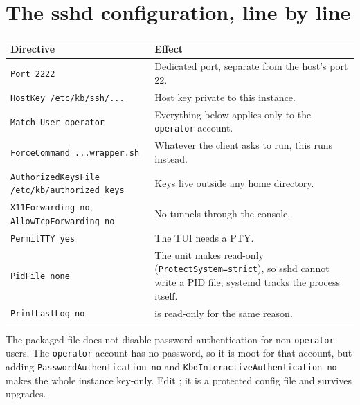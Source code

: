 \section{The sshd configuration, line by line}

\begin{center}\small
\begin{tabularx}{\textwidth}{@{}L{4.6cm}Y@{}}
\toprule
\textbf{Directive} & \textbf{Effect}\\
\midrule
\texttt{Port 2222} & Dedicated port, separate from the host's port 22.\\
\texttt{HostKey /etc/kb/ssh/...} & Host key private to this instance.\\
\texttt{Match User operator} & Everything below applies only to the \texttt{operator} account.\\
\texttt{ForceCommand ...wrapper.sh} & Whatever the client asks to run, this runs instead.\\
\texttt{AuthorizedKeysFile /etc/kb/authorized\_keys} & Keys live outside any home directory.\\
\texttt{X11Forwarding no}, \texttt{AllowTcpForwarding no} & No tunnels through the console.\\
\texttt{PermitTTY yes} & The TUI needs a PTY.\\
\texttt{PidFile none} & The unit makes  read-only (\texttt{ProtectSystem=strict}), so sshd cannot write a PID file; systemd tracks the process itself.\\
\texttt{PrintLastLog no} &  is read-only for the same reason.\\
\bottomrule
\end{tabularx}
\end{center}
\begin{kbnote}
The packaged file does not disable password authentication for non-\texttt{operator} users. The
\texttt{operator} account has no password, so it is moot for that account, but adding
\texttt{PasswordAuthentication no} and \texttt{KbdInteractiveAuthentication no} makes the whole instance
key-only. Edit ; it is a protected config file and survives upgrades.
\end{kbnote}

